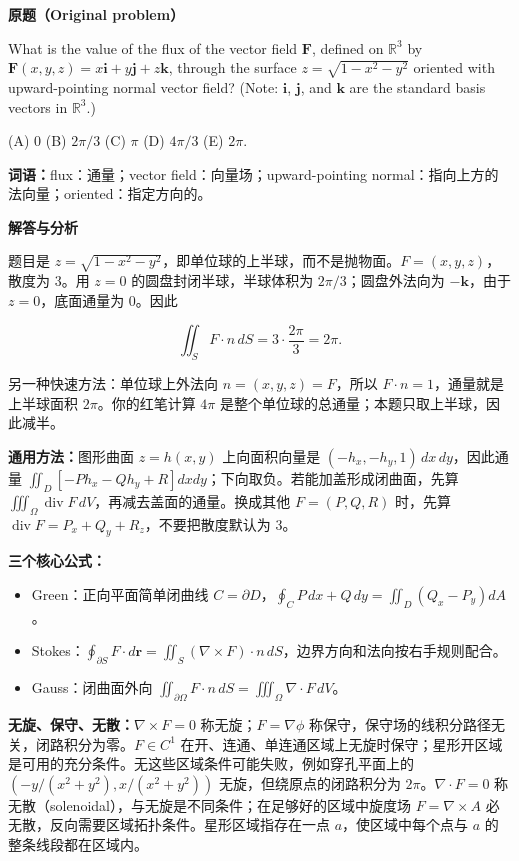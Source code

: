 \documentclass[11pt,a4paper]{ctexart}
\providecommand{\tightlist}{\setlength{\itemsep}{0pt}\setlength{\parskip}{0pt}}
\begin{document}
\textbf{原题（Original problem）}\par
What is the value of the flux of the vector field $\mathbf F$, defined on $\mathbb R^3$ by $\mathbf F(x,y,z)=x\mathbf i+y\mathbf j+z\mathbf k$, through the surface $z=\sqrt{1-x^2-y^2}$ oriented with upward-pointing normal vector field? (Note: $\mathbf i$, $\mathbf j$, and $\mathbf k$ are the standard basis vectors in $\mathbb R^3$.)

(A) $0$ \quad (B) $2\pi/3$ \quad (C) $\pi$ \quad (D) $4\pi/3$ \quad (E) $2\pi$.

\textbf{词语：}flux：通量；vector field：向量场；upward-pointing normal：指向上方的法向量；oriented：指定方向的。

\textbf{解答与分析}\par


题目是
\(z=\sqrt{1-x^2-y^2}\)，即单位球的上半球，而不是抛物面。\(F=(x,y,z)\)，散度为
3。用 \(z=0\) 的圆盘封闭半球，半球体积为 \(2\pi/3\)；圆盘外法向为
\(-\mathbf k\)，由于 \(z=0\)，底面通量为 0。因此

\[\iint_S F\cdot n\,dS=3\cdot\frac{2\pi}{3}=2\pi.\]

另一种快速方法：单位球上外法向 \(n=(x,y,z)=F\)，所以
\(F\cdot n=1\)，通量就是上半球面积 \(2\pi\)。你的红笔计算 \(4\pi\)
是整个单位球的总通量；本题只取上半球，因此减半。

\textbf{通用方法：}图形曲面 \(z=h(x,y)\) 上向面积向量是
\((-h_x,-h_y,1)\,dx\,dy\)，因此通量
\(\iint_D[-P h_x-Q h_y+R]dxdy\)；下向取负。若能加盖形成闭曲面，先算
\(\iiint_\Omega\operatorname{div}F\,dV\)，再减去盖面的通量。换成其他
\(F=(P,Q,R)\) 时，先算
\(\operatorname{div}F=P_x+Q_y+R_z\)，不要把散度默认为 3。

\textbf{三个核心公式：}

\begin{itemize}
\tightlist
\item
  Green：正向平面简单闭曲线
  \(C=\partial D\)，\(\oint_C P\,dx+Q\,dy=\iint_D(Q_x-P_y)dA\)。
\item
  Stokes：\(\oint_{\partial S}F\cdot d\mathbf r=\iint_S(\nabla\times F)\cdot n\,dS\)，边界方向和法向按右手规则配合。
\item
  Gauss：闭曲面外向
  \(\iint_{\partial\Omega}F\cdot n\,dS=\iiint_\Omega\nabla\cdot F\,dV\)。
\end{itemize}

\textbf{无旋、保守、无散：}\(\nabla\times F=0\) 称无旋；\(F=\nabla\phi\)
称保守，保守场的线积分路径无关，闭路积分为零。\(F\in C^1\)
在开、连通、单连通区域上无旋时保守；星形开区域是可用的充分条件。无这些区域条件可能失败，例如穿孔平面上的
\((-y/(x^2+y^2),x/(x^2+y^2))\) 无旋，但绕原点的闭路积分为
\(2\pi\)。\(\nabla\cdot F=0\)
称无散（solenoidal），与无旋是不同条件；在足够好的区域中旋度场
\(F=\nabla\times A\) 必无散，反向需要区域拓扑条件。星形区域指存在一点
\(a\)，使区域中每个点与 \(a\) 的整条线段都在区域内。
\end{document}
